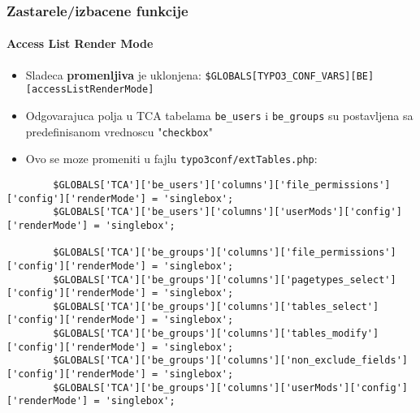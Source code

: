
\begin{frame}[fragile]
	\frametitle{Zastarele/izbacene funkcije}
	\framesubtitle{Access List Render Mode}

	\lstset{basicstyle=\tiny\ttfamily}

	\begin{itemize}

		\item Sladeca \textbf{promenljiva} je uklonjena:
			\small\texttt{\$GLOBALS[TYPO3\_CONF\_VARS][BE][accessListRenderMode]}\normalsize

		\item Odgovarajuca polja u TCA tabelama \texttt{be\_users} i \texttt{be\_groups}
			su postavljena sa predefinisanom vrednoscu "\texttt{checkbox}"

		\item Ovo se moze promeniti u fajlu \texttt{typo3conf/extTables.php}:

	\end{itemize}

	\begin{lstlisting}
		$GLOBALS['TCA']['be_users']['columns']['file_permissions']['config']['renderMode'] = 'singlebox';
		$GLOBALS['TCA']['be_users']['columns']['userMods']['config']['renderMode'] = 'singlebox';

		$GLOBALS['TCA']['be_groups']['columns']['file_permissions']['config']['renderMode'] = 'singlebox';
		$GLOBALS['TCA']['be_groups']['columns']['pagetypes_select']['config']['renderMode'] = 'singlebox';
		$GLOBALS['TCA']['be_groups']['columns']['tables_select']['config']['renderMode'] = 'singlebox';
		$GLOBALS['TCA']['be_groups']['columns']['tables_modify']['config']['renderMode'] = 'singlebox';
		$GLOBALS['TCA']['be_groups']['columns']['non_exclude_fields']['config']['renderMode'] = 'singlebox';
		$GLOBALS['TCA']['be_groups']['columns']['userMods']['config']['renderMode'] = 'singlebox';
	\end{lstlisting}

\end{frame}

